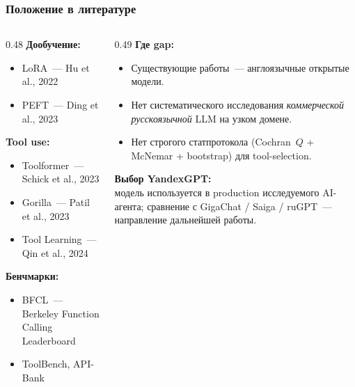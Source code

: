 \documentclass[aspectratio=169]{beamer}
\begin{document}
\begin{frame}
\frametitle{Положение в литературе}
\begin{columns}[T]
\begin{column}{0.48\textwidth}
\textbf{Дообучение:}
\begin{itemize}
  \item LoRA~— Hu et al., 2022
  \item PEFT~— Ding et al., 2023
\end{itemize}

\textbf{Tool use:}
\begin{itemize}
  \item Toolformer~— Schick et al., 2023
  \item Gorilla~— Patil et al., 2023
  \item Tool Learning~— Qin et al., 2024
\end{itemize}

\textbf{Бенчмарки:}
\begin{itemize}
  \item BFCL~— Berkeley Function Calling Leaderboard
  \item ToolBench, API-Bank
\end{itemize}
\end{column}
\begin{column}{0.49\textwidth}
\textbf{Где gap:}
\begin{itemize}
  \item Существующие работы~— англоязычные открытые модели.
  \item Нет систематического исследования \emph{коммерческой русскоязычной} LLM на узком домене.
  \item Нет строгого статпротокола (Cochran~$Q$ + McNemar + bootstrap) для tool-selection.
\end{itemize}

\bigskip
\textbf{Выбор YandexGPT:}\\
модель используется в production исследуемого AI-агента; сравнение с GigaChat / Saiga / ruGPT~— направление дальнейшей работы.
\end{column}
\end{columns}
\end{frame}
\end{document}
